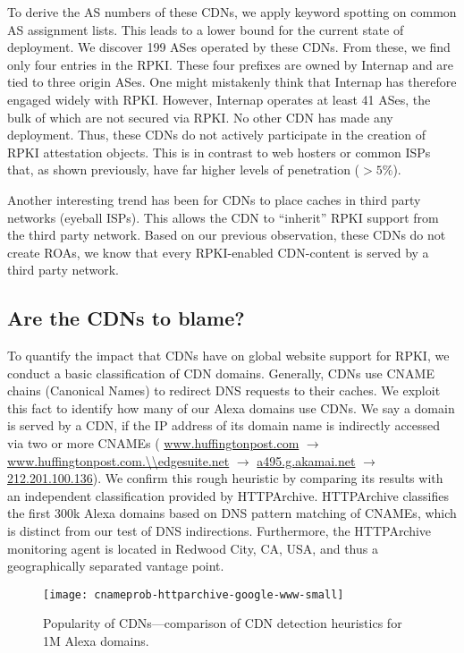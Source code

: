 To derive the AS numbers of these CDNs, we apply keyword spotting on common AS assignment lists.
This leads to a lower bound for the current state of deployment.
We discover 199 ASes operated by these CDNs.
From these, we find only four entries in the RPKI.
These four prefixes are owned by Internap and are tied to three origin ASes. One might mistakenly think that Internap has therefore engaged widely with RPKI. However, Internap operates at least 41 ASes, the bulk of which are not secured via RPKI. No other CDN has made any deployment. Thus, these CDNs do not actively participate in the creation of RPKI attestation objects. This is in contrast to web hosters or common ISPs that, as shown previously, have far higher levels of penetration ($>5\%$).




Another interesting trend has been for CDNs to place caches in third party networks (\eg eyeball ISPs).
This allows the CDN to ``inherit'' RPKI support from the third party network.
Based on our previous observation, \ie these CDNs do not create ROAs, we know that every RPKI-enabled CDN-content is served by a third party network.





\subsection{Are the CDNs to blame?}

To quantify the impact that CDNs have on global website support for RPKI, we conduct a basic classification of CDN domains.
Generally, CDNs use CNAME chains (Canonical Names) to redirect DNS requests to
their caches. We exploit this fact to identify how many of our Alexa domains use CDNs.
We say a domain is served by a CDN, if the IP address
of its domain name is indirectly accessed via two or more CNAMEs (\eg
\url{www.huffingtonpost.com} $\rightarrow$
\url{www.huffingtonpost.com.\\edgesuite.net} $\rightarrow$
\url{a495.g.akamai.net} $\rightarrow$ \url{212.201.100.136}).
We confirm this rough heuristic by comparing its results with an independent
classification provided by HTTP\-Archive. HTTP\-Archive classifies the first
300k Alexa domains based on DNS pattern matching of CNAMEs, which is distinct from our test of DNS indirections. Furthermore, the HTTPArchive monitoring agent is located in Redwood City, CA, USA, and thus a geographically separated vantage point.

\begin{figure}
  \texttt{[image: cnameprob-httparchive-google-www-small]}
  \caption{Popularity of CDNs---comparison of CDN detection heuristics for 1M Alexa domains.}
  \label{fig:cnameprob-httparchive-google-www}
\end{figure}

